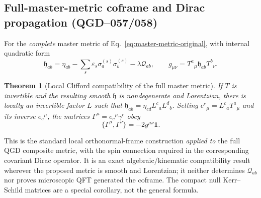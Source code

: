 \documentclass[11pt,a4paper]{article}
\newtheorem{theorem}{Theorem}[section]
\begin{document}
\subsection{Full-master-metric coframe and Dirac propagation (QGD--057/058)}\label{sec:qgd060-clifford}
For the \emph{complete} master metric of Eq.~\eqref{eq:master-metric-original}, with internal quadratic form
\begin{equation}\label{eq:qgd060-internal-metric}
 \mathfrak h_{ab}=\eta_{ab}-\sum_s\varepsilon_s\sigma_a^{(s)}\sigma_b^{(s)}
 -\lambda\mathcal Q_{ab},\qquad g_{\mu\nu}=T^a{}_{\mu}\mathfrak h_{ab}T^b{}_{\nu}.
\end{equation}
\begin{theorem}[Local Clifford compatibility of the full master metric]\label{thm:qgd060-clifford}
If $T$ is invertible and the resulting smooth $\mathfrak h$ is nondegenerate and Lorentzian, there is locally an invertible factor $L$ such that $\mathfrak h_{ab}=\eta_{cd}L^c{}_a L^d{}_b$.  Setting $e^c{}_{\mu}=L^c{}_aT^a{}_{\mu}$ and its inverse $e_c{}^\mu$, the matrices $\Gamma^\mu=e_c{}^\mu\gamma^c$ obey
\begin{equation}\label{eq:qgd060-Clifford}
 \boxed{\{\Gamma^\mu,\Gamma^\nu\}=-2g^{\mu\nu}\mathbf1.}
\end{equation}
\end{theorem}
This is the standard local orthonormal-frame construction \emph{applied to} the full QGD composite metric, with the spin connection required in the corresponding covariant Dirac operator.  It is an exact algebraic/kinematic compatibility result wherever the proposed metric is smooth and Lorentzian; it neither determines $\mathcal Q_{ab}$ nor proves microscopic QFT generated the coframe.  The compact null Kerr--Schild matrices are a special corollary, not the general formula.
\end{document}
